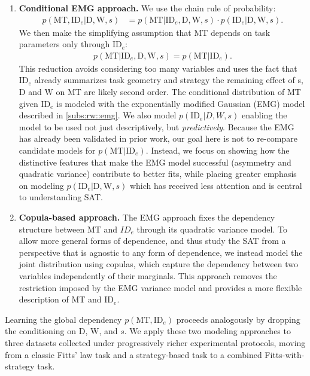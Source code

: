 \documentclass[acmlarge, manuscript,review]{acmart}
\newcommand{\mt}{\ensuremath{{\text{MT}}}\xspace}
\newcommand{\ide}{\ensuremath{{\text{ID}_e}}\xspace}
\newcommand{\D}{\ensuremath{{\text{D}}}\xspace}
\newcommand{\W}{\ensuremath{{\text{W}}}\xspace}
\begin{document}
\begin{enumerate}
	\item \textbf{Conditional EMG approach.}  
	We use the chain rule of probability:
	\begin{align}
		p(\mt, \ide | \D, \W, s) 
		&= p(\mt | \ide, \D, \W, s) \cdot{} p(\ide | \D, \W, s).
	\end{align}
	We then make the simplifying assumption that MT depends on task parameters only through \ide:
	\begin{align}
		p(\mt | \ide, \D, \W, s) = p(\mt | \ide).
	\end{align}
	This reduction avoids considering too many variables and uses the fact that \ide already summarizes task geometry and strategy \ie the remaining effect of s, \D and \W on MT are likely second order. 
	The conditional distribution of MT given \ide is modeled with the exponentially modified Gaussian (EMG) model described in \autoref{subs:rw::emg}. 
	We also model \(p(\ide | D, W, s)\) enabling the model to be used not just descriptively, but \textit{predictively}.
	Because the EMG has already been validated in prior work, our goal here is not to re-compare candidate models for $p(\mt|\ide)$. Instead, we focus on showing how the distinctive features that make the EMG model successful (asymmetry and quadratic variance) contribute to better fits, while placing greater emphasis on modeling $p(\ide| \D,\W,s)$ which has received less attention and is central to understanding SAT.
	
	\item \textbf{Copula-based approach.}  
	The EMG approach fixes the dependency structure between MT and \(ID_e\) through its quadratic variance model. 
	To allow more general forms of dependence, and thus study the SAT from a perspective that is agnostic to any form of dependence, we instead model the joint distribution using copulas, which capture the dependency between two variables independently of their marginals. 
	This approach removes the restriction imposed by the EMG variance model and provides a more flexible description of MT and \ide.
\end{enumerate}
\noindent Learning the global dependency \(p(\mt, \ide)\) proceeds analogously by dropping the conditioning on \D, \W, and $s$.
We apply these two modeling approaches to three datasets collected under progressively richer experimental protocols, moving from a classic Fitts' law task and a strategy-based task to a combined Fitts-with-strategy task.
\end{document}

